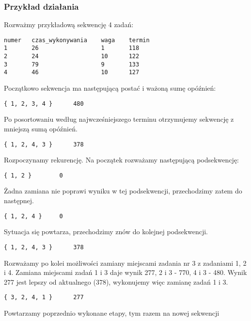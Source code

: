 \documentclass[polish,polish,a4paper]{article}
\begin{document}
\subsubsection{Przykład działania}
\lstset{style=shortStyle}

Rozważmy przykładową sekwencję 4 zadań:

\begin{lstlisting}
numer	czas_wykonywania	waga	termin
1		26					1		118
2		24					10		122
3		79					9		133
4		46					10		127
\end{lstlisting}

Początkowo sekwencja ma następującą postać i ważoną sumę opóźnień:

\begin{lstlisting}
{ 1, 2, 3, 4 }		480
\end{lstlisting}

Po posortowaniu według najwcześniejszego terminu otrzymujemy sekwencję z mniejszą sumą opóźnień.

\begin{lstlisting}
{ 1, 2, 4, 3 }		378
\end{lstlisting}

Rozpoczynamy rekurencję. Na początek rozważamy następującą podsekwencję:

\begin{lstlisting}
{ 1, 2 }		0
\end{lstlisting}

Żadna zamiana nie poprawi wyniku w tej podsekwencji, przechodzimy zatem do następnej.

\begin{lstlisting}
{ 1, 2, 4 }		0
\end{lstlisting}

Sytuacja się powtarza, przechodzimy znów do kolejnej podsekwencji.

\begin{lstlisting}
{ 1, 2, 4, 3 }		378
\end{lstlisting}

Rozważamy po kolei możliwości zamiany miejscami zadania nr 3 z zadaniami 1, 2 i 4. Zamiana miejscami zadań 1 i 3 daje wynik 277, 2 i 3 - 770, 4 i 3 - 480. Wynik 277 jest lepszy od aktualnego (378), wykonujemy więc zamianę zadań 1 i 3.

\begin{lstlisting}
{ 3, 2, 4, 1 }		277
\end{lstlisting}

Powtarzamy poprzednio wykonane etapy, tym razem na nowej sekwencji
\end{document}
